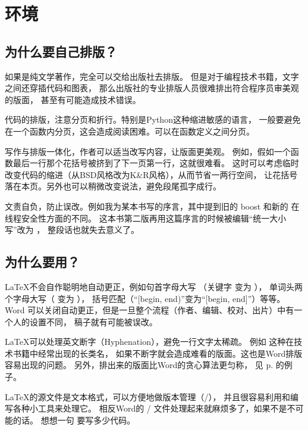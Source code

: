 \chapter{环境}

\section{为什么要自己排版？}
\label{sec:whyTypesetting}

如果是纯文学著作，完全可以交给出版社去排版。
但是对于编程技术书籍，文字之间还穿插代码和图表，
那么出版社的专业排版人员很难排出符合程序员审美观的版面，
甚至有可能造成技术错误。


\begindot
\item 代码的排版，注意分页和折行。特别是Python这种缩进敏感的语言，
一般要避免在一个函数内分页，这会造成阅读困难。可以在函数定义之间分页。

\item 写作与排版一体化，作者可以适当改写内容，让版面更美观。
例如，假如一个函数最后一行那个花括号被挤到了下一页第一行，这就很难看。
这时可以考虑临时改变代码的缩进（从BSD风格改为K\&R风格），从而节省一两行空间，
让花括号落在本页。另外也可以稍微改变说法，避免段尾孤字成行。

\item 文责自负，防止误改。例如我为某本书写的序言，其中提到旧的 boost 
 和新的   在线程安全性方面的不同。
这本书第二版再用这篇序言的时候被编辑“统一大小写”改为 ，
整段话也就失去意义了。
\myenddot


\section{为什么要用？}
\begindot
\item \LaTeX 不会自作聪明地自动更正，例如句首字母大写
（关键字  变为 ），
单词头两个字母大写（ 变为 ），
括号匹配（“[begin, end)”变为“[begin, end]”）等等。
Word 可以关闭自动更正，但是一旦整个流程（作者、编辑、校对、出片）中有一个人的设置不同，
稿子就有可能被误改。

\item \LaTeX 可以处理英文断字（Hyphenation），避免一行文字太稀疏。
例如 这种在技术书籍中经常出现的长类名，
如果不断字就会造成难看的版面。这也是Word排版容易出现的问题。
另外，排出来的版面比Word的贪心算法更匀称，
见 p.\pageref{ex:dynamicProgramming} 的例子。

\item \LaTeX 的源文件是文本格式，可以方便地做版本管理（/），
并且很容易利用和编写各种小工具来处理它。
相反Word的 / 文件处理起来就麻烦多了，如果不是不可能的话。
想想一句  要写多少代码。


